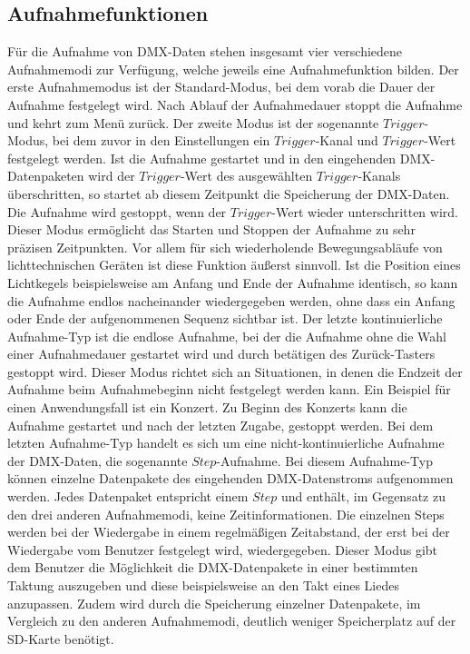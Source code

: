 
\subsection{Aufnahmefunktionen}
\label{sec:recfunctions}
Für die Aufnahme von DMX-Daten stehen insgesamt vier verschiedene Aufnahmemodi zur Verfügung, welche jeweils eine Aufnahmefunktion bilden. Der erste Aufnahmemodus ist der Standard-Modus, bei dem vorab die Dauer der Aufnahme festgelegt wird. Nach Ablauf der Aufnahmedauer stoppt die Aufnahme und kehrt zum Menü zurück. Der zweite Modus ist der sogenannte $Trigger$-Modus, bei dem zuvor in den Einstellungen ein $Trigger$-Kanal und $Trigger$-Wert festgelegt werden. Ist die Aufnahme gestartet und in den eingehenden DMX-Datenpaketen wird der $Trigger$-Wert des ausgewählten $Trigger$-Kanals überschritten, so startet ab diesem Zeitpunkt die Speicherung der DMX-Daten. Die Aufnahme wird gestoppt, wenn der $Trigger$-Wert wieder unterschritten wird. Dieser Modus ermöglicht das Starten und Stoppen der Aufnahme zu sehr präzisen Zeitpunkten. Vor allem für sich wiederholende Bewegungsabläufe von lichttechnischen Geräten ist diese Funktion äußerst sinnvoll. Ist die Position eines Lichtkegels beispielsweise am Anfang und Ende der Aufnahme identisch, so kann die Aufnahme endlos nacheinander wiedergegeben werden, ohne dass ein Anfang oder Ende der aufgenommenen Sequenz sichtbar ist. Der letzte kontinuierliche Aufnahme-Typ ist die endlose Aufnahme, bei der die Aufnahme ohne die Wahl einer Aufnahmedauer gestartet wird und durch betätigen des Zurück-Tasters gestoppt wird. Dieser Modus richtet sich an Situationen, in denen die Endzeit der Aufnahme beim Aufnahmebeginn nicht festgelegt werden kann. Ein Beispiel für einen Anwendungsfall ist ein Konzert. Zu Beginn des Konzerts kann die Aufnahme gestartet und nach der letzten Zugabe, gestoppt werden. Bei dem letzten Aufnahme-Typ handelt es sich um eine nicht-kontinuierliche Aufnahme der DMX-Daten, die sogenannte $Step$-Aufnahme. Bei diesem Aufnahme-Typ können einzelne Datenpakete des eingehenden DMX-Datenstroms aufgenommen werden. Jedes Datenpaket entspricht einem $Step$ und enthält, im Gegensatz zu den drei anderen Aufnahmemodi, keine Zeitinformationen. Die einzelnen Steps werden bei der Wiedergabe in einem regelmäßigen Zeitabstand, der erst bei der Wiedergabe vom Benutzer festgelegt wird, wiedergegeben. Dieser Modus gibt dem Benutzer die Möglichkeit die DMX-Datenpakete in einer bestimmten Taktung auszugeben und diese beispielsweise an den Takt eines Liedes anzupassen. Zudem wird durch die Speicherung einzelner Datenpakete, im Vergleich zu den anderen Aufnahmemodi, deutlich weniger Speicherplatz auf der SD-Karte benötigt. 

